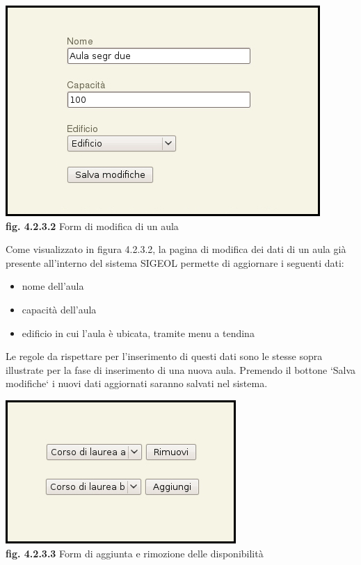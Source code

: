\documentclass[11pt,a4paper]{article}
\begin{document}
\begin{center}
	\includegraphics[scale=0.5]{images/modifica_aula.jpg}\\
	\textbf{fig. 4.2.3.2} Form di modifica di un aula\\
\end{center}

Come visualizzato in figura 4.2.3.2, la pagina di modifica dei dati di un aula già presente all'interno del sistema SIGEOL permette di aggiornare i seguenti dati:
\begin{itemize}
 \item nome dell'aula
 \item capacità dell'aula
 \item edificio in cui l'aula è ubicata, tramite menu a tendina
\end{itemize}
Le regole da rispettare per l'inserimento di questi dati sono le stesse sopra illustrate per la fase di inserimento di una nuova aula.
Premendo il bottone `Salva modifiche` i nuovi dati aggiornati saranno salvati nel sistema.

\begin{center}
	\includegraphics[scale=0.5]{images/modifica_aula_corso.jpg}\\
	\textbf{fig. 4.2.3.3} Form di aggiunta e rimozione delle disponibilità\\
\end{center}
\end{document}
